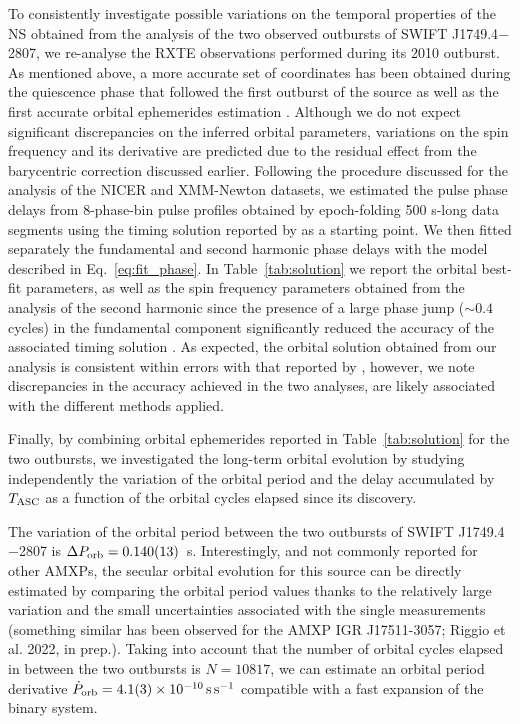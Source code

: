 \documentclass[fleqn,usenatbib]{mnras}
\newcommand{\swiftj}{SWIFT J1749.4$-$2807}
\newcommand{\nicer}{NICER}
\newcommand{\xmm}{XMM-Newton}
\newcommand{\rxte}{RXTE}
\begin{document}
To consistently investigate possible variations on the temporal properties of the NS obtained from the analysis of the two observed outbursts of \swiftj{}, we re-analyse the \rxte{} observations performed during its 2010 outburst. As mentioned above, a more accurate set of coordinates has been obtained during the quiescence phase that followed the first outburst of the source \citep{Jonker:2013wp} as well as the first accurate orbital ephemerides estimation \citep{Markwardt:2010tl}. Although we do not expect significant discrepancies on the inferred orbital parameters, variations on the spin frequency and its derivative are predicted due to the residual effect from the barycentric correction discussed earlier. Following the procedure discussed for the analysis of the \nicer{} and \xmm{} datasets, we estimated the pulse phase delays from 8-phase-bin pulse profiles obtained by epoch-folding 500 s-long data segments using the timing solution reported by \citet{Markwardt:2010tl} as a starting point. We then fitted separately the fundamental and second harmonic phase delays with the model described in Eq.~\ref{eq:fit_phase}. In Table~\ref{tab:solution} we report the orbital best-fit parameters, as well as the spin frequency parameters obtained from the analysis of the second harmonic since the presence of a large phase jump ($\sim0.4$ cycles) in the fundamental component significantly reduced the accuracy of the associated timing solution \citep[a similar conclusion has been reached by][]{Markwardt:2010tl,Altamirano:2011uq}. As expected, the orbital solution obtained from our analysis is consistent within errors with that reported by \citet{Markwardt:2010tl}, however, we note discrepancies in the accuracy achieved in the two analyses, are likely associated with the different methods applied.  


Finally, by combining orbital ephemerides reported in Table~\ref{tab:solution} for the two outbursts, we investigated the long-term orbital evolution by studying independently the variation of the orbital period and the delay accumulated by $T_{\rm ASC}$ as a function of the orbital cycles elapsed since its discovery. 

The variation of the orbital period between the two outbursts of \swiftj{} is $\Delta P_{\rm orb}=0.140(13)$~s. Interestingly, and not commonly reported for other AMXPs, the secular orbital evolution for this source can be directly estimated by comparing the orbital period values thanks to the relatively large variation and the small uncertainties associated with the single measurements (something similar has been observed for the AMXP IGR J17511-3057; Riggio et al. 2022, in prep.). Taking into account that the number of orbital cycles elapsed in between the two outbursts is $N=10817$, we can estimate an orbital period derivative $\dot{P}_{\rm orb}=4.1(3)\times 10^{-10}\,\text{s}\,\text{s}^{-1}$ compatible with a fast expansion of the binary system.
\end{document}
